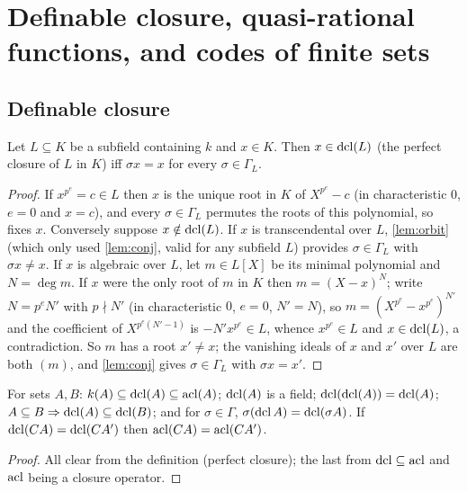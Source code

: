\section{Definable closure, quasi-rational functions, and codes of finite sets}
\label{sec:codes}

\subsection{Definable closure}

\begin{lemma}\label{lem:dcl-galois}
Let $L\subseteq K$ be a subfield containing $k$ and $x\in K$.  Then $x\in\operatorname{dcl}(L)$ (the
perfect closure of $L$ in $K$) iff $\sigma x=x$ for every $\sigma\in\Gamma_L$.
\end{lemma}
\begin{proof}
If $x^{p^e}=c\in L$ then $x$ is the unique root in $K$ of $X^{p^e}-c$ (in
characteristic $0$, $e=0$ and $x=c$), and every $\sigma\in\Gamma_L$ permutes the roots of
this polynomial, so fixes $x$.  Conversely suppose $x\notin\operatorname{dcl}(L)$.  If $x$ is
transcendental over $L$, \cref{lem:orbit} (which only used \cref{lem:conj}, valid for
any subfield $L$) provides $\sigma\in\Gamma_L$ with $\sigma x\ne x$.  If $x$ is
algebraic over $L$, let $m\in L[X]$ be its minimal polynomial and $N=\deg m$.  If $x$
were the only root of $m$ in $K$ then $m=(X-x)^N$; write $N=p^eN'$ with $p\nmid N'$
(in characteristic $0$, $e=0$, $N'=N$), so $m=(X^{p^e}-x^{p^e})^{N'}$ and the
coefficient of $X^{p^e(N'-1)}$ is $-N'x^{p^e}\in L$, whence $x^{p^e}\in L$ and
$x\in\operatorname{dcl}(L)$, a contradiction.  So $m$ has a root $x'\ne x$; the vanishing ideals of $x$
and $x'$ over $L$ are both $(m)$, and \cref{lem:conj} gives $\sigma\in\Gamma_L$ with
$\sigma x=x'$.
\end{proof}

\begin{corollary}\label{cor:dcl-props}
For sets $A,B$: $k(A)\subseteq\operatorname{dcl}(A)\subseteq\operatorname{acl}(A)$; $\operatorname{dcl}(A)$ is a field;
$\operatorname{dcl}(\operatorname{dcl}(A))=\operatorname{dcl}(A)$; $A\subseteq B\Rightarrow\operatorname{dcl}(A)\subseteq\operatorname{dcl}(B)$; and for
$\sigma\in\Gamma$, $\sigma(\operatorname{dcl} A)=\operatorname{dcl}(\sigma A)$.  If $\operatorname{dcl}(CA)=\operatorname{dcl}(CA')$ then
$\operatorname{acl}(CA)=\operatorname{acl}(CA')$.
\end{corollary}
\begin{proof}
All clear from the definition (perfect closure); the last from
$\operatorname{dcl}\subseteq\operatorname{acl}$ and $\operatorname{acl}$ being a closure operator.
\end{proof}

